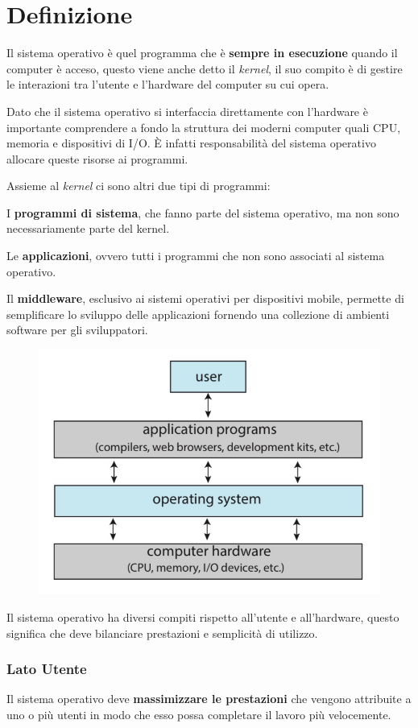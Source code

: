 \section{Definizione}

Il sistema operativo è quel programma che è \textbf{sempre in esecuzione} quando il computer è acceso, questo viene anche detto il \textit{kernel}, il suo compito è di gestire le interazioni tra l'utente e l'hardware del computer su cui opera.

\spacer
Dato che il sistema operativo si interfaccia direttamente con l'hardware è importante comprendere a fondo la struttura dei moderni computer quali CPU, memoria e dispositivi di I/O. È infatti responsabilità del sistema operativo allocare queste risorse ai programmi.

\spacer
Assieme al \textit{kernel} ci sono altri due tipi di programmi:
\begin{sitemize}
    \item I \textbf{programmi di sistema}, che fanno parte del sistema operativo, ma non sono necessariamente parte del kernel.
    \item Le \textbf{applicazioni}, ovvero tutti i programmi che non sono associati al sistema operativo.
    \item Il \textbf{middleware}, esclusivo ai sistemi operativi per dispositivi mobile, permette di semplificare lo sviluppo delle applicazioni fornendo una collezione di ambienti software per gli sviluppatori.
\end{sitemize}

\begin{figure}[H]
    \centering
    \includegraphics[width=0.45\linewidth]{assets/image.jpeg}
\end{figure}

Il sistema operativo ha diversi compiti rispetto all'utente e all'hardware, questo significa che deve bilanciare prestazioni e semplicità di utilizzo.

\subsubsection*{Lato Utente}
Il sistema operativo deve \textbf{massimizzare le prestazioni} che vengono attribuite a uno o più utenti in modo che esso possa completare il lavoro più velocemente.

